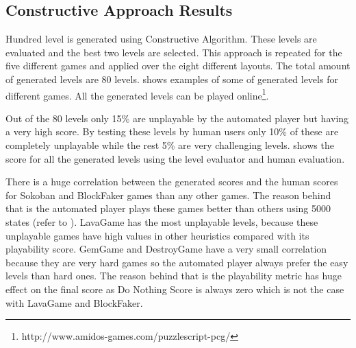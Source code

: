 
\subsection{Constructive Approach Results}
Hundred level is generated using Constructive Algorithm. These levels are evaluated and the best two levels are selected. This approach is repeated for the five different games and applied over the eight different layouts. The total amount of generated levels are 80 levels.  shows examples of some of generated levels for different games. All the generated levels can be played online\footnote{http://www.amidos-games.com/puzzlescript-pcg/}.\\\par


Out of the 80 levels only 15\% are unplayable by the automated player but having a very high score. By testing these levels by human users only 10\% of these are completely unplayable while the rest 5\% are very challenging levels.  shows the score for all the generated levels using the level evaluator and human evaluation.\\\par

There is a huge correlation between the generated scores and the human scores for Sokoban and BlockFaker games than any other games. The reason behind that is the automated player plays these games better than others using 5000 states (refer to ). LavaGame has the most unplayable levels, because these unplayable games have high values in other heuristics compared with its playability score. GemGame and DestroyGame have a very small correlation because they are very hard games so the automated player always prefer the easy levels than hard ones. The reason behind that is the playability metric has huge effect on the final score as Do Nothing Score is always zero which is not the case with LavaGame and BlockFaker.

